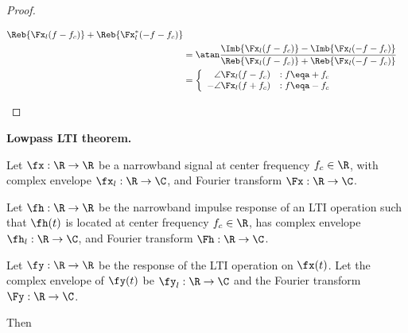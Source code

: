 \begin{proof}
\begin{enumerate}
\begin{align*}
                      {\Reb{\Fx_l(f-f_c)} + \Reb{\Fx_l^\ast(-f-f_c) }}
       \\&= \atan\frac{\Imb{\Fx_l(f-f_c)} - \Imb{\Fx_l(-f-f_c) }}
                      {\Reb{\Fx_l(f-f_c)} + \Reb{\Fx_l(-f-f_c) }}
       \\&= \left\{\begin{array}{rl}
             \angle\Fx_l(f-f_c) &:f\eqa +f_c \\
            -\angle\Fx_l(f+f_c) &:f\eqa -f_c
            \end{array}\right.
    \end{align*}
\end{enumerate}
\end{proof}

\begin{theorem}{\bf Lowpass LTI theorem.}
\label{thm:cmplxEnvLTI}
\begin{enume}
  \item Let $\fx:\R\to\R$ be a narrowband signal
        at center frequency $f_c\in\R$,
        with complex envelope $\fx_l:\R\to\C$,
        and Fourier transform $\Fx:\R\to\C$.
  \item Let $\fh:\R\to\R$ be the narrowband impulse response
        of an LTI operation such that $\fh(t)$ is located
        at center frequency $f_c\in\R$,
        has complex envelope $\fh_l:\R\to\C$,
        and Fourier transform $\Fh:\R\to\C$.
  \item Let $\fy:\R\to\R$ be the response of
        the LTI operation on $\fx(t)$.
        Let the complex envelope of $\fy(t)$ be $\fy_l:\R\to\C$
        and the Fourier transform $\Fy:\R\to\C$.
\end{enume}
Then
\end{theorem}
